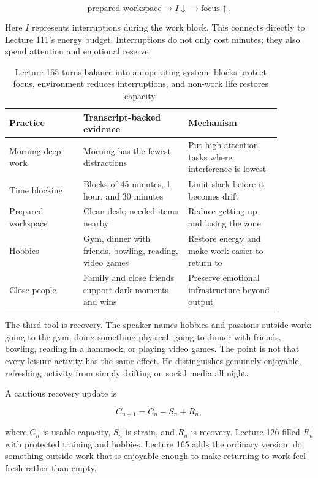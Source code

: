 \documentclass[11pt,oneside]{book}
\begin{document}
\[
\text{prepared workspace}
\longrightarrow
I\downarrow
\longrightarrow
\text{focus}\uparrow.
\]

Here \(I\) represents interruptions during the work block. This connects directly to Lecture 111's energy budget. Interruptions do not only cost minutes; they also spend attention and emotional reserve.

\begin{table}
\centering
\small
\begin{tabular}{p{0.24\linewidth}p{0.34\linewidth}p{0.30\linewidth}}
\hline
Practice & Transcript-backed evidence & Mechanism\\
\hline
Morning deep work & Morning has the fewest distractions & Put high-attention tasks where interference is lowest\\
Time blocking & Blocks of 45 minutes, 1 hour, and 30 minutes & Limit slack before it becomes drift\\
Prepared workspace & Clean desk; needed items nearby & Reduce getting up and losing the zone\\
Hobbies & Gym, dinner with friends, bowling, reading, video games & Restore energy and make work easier to return to\\
Close people & Family and close friends support dark moments and wins & Preserve emotional infrastructure beyond output\\
\hline
\end{tabular}
\caption{Lecture 165 turns balance into an operating system: blocks protect focus, environment reduces interruptions, and non-work life restores capacity.}
\end{table}

The third tool is recovery. The speaker names hobbies and passions outside work: going to the gym, doing something physical, going to dinner with friends, bowling, reading in a hammock, or playing video games. The point is not that every leisure activity has the same effect. He distinguishes genuinely enjoyable, refreshing activity from simply drifting on social media all night.

A cautious recovery update is

\[
C_{n+1}=C_n-S_n+R_n,
\]

where \(C_n\) is usable capacity, \(S_n\) is strain, and \(R_n\) is recovery. Lecture 126 filled \(R_n\) with protected training and hobbies. Lecture 165 adds the ordinary version: do something outside work that is enjoyable enough to make returning to work feel fresh rather than empty.
\end{document}
